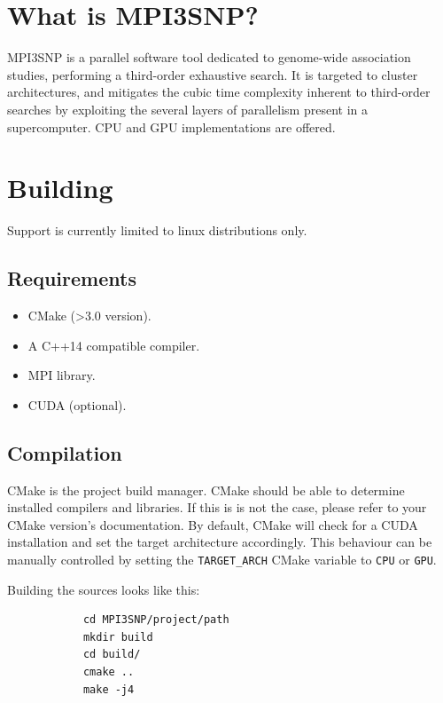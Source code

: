 \documentclass[12pt,hidelinks]{article}
\begin{document}
\section{What is MPI3SNP?}
    MPI3SNP is a parallel software tool dedicated to genome-wide association studies, performing a third-order exhaustive search. It is targeted to cluster architectures, and mitigates the cubic time complexity inherent to third-order searches by exploiting the several layers of parallelism present in a supercomputer. CPU and GPU implementations are offered.
\section{Building}
    Support is currently limited to linux distributions only.

    \subsection{Requirements}
        \begin{itemize}
            \item CMake (>3.0 version).
            \item A C++14 compatible compiler.
            \item MPI library.
            \item CUDA (optional).
        \end{itemize}
        
    \subsection{Compilation}
        CMake is the project build manager. CMake should be able to determine installed compilers and libraries. If this is is not the case, please refer to your CMake version's documentation. By default, CMake will check for a CUDA installation and set the target architecture accordingly. This behaviour can be manually controlled by setting the \texttt{TARGET\_ARCH} CMake variable to \texttt{CPU} or \texttt{GPU}.

        Building the sources looks like this:

        \begin{verbatim}
            cd MPI3SNP/project/path
            mkdir build
            cd build/
            cmake ..
            make -j4
        \end{verbatim}
\clearpage
\end{document}
